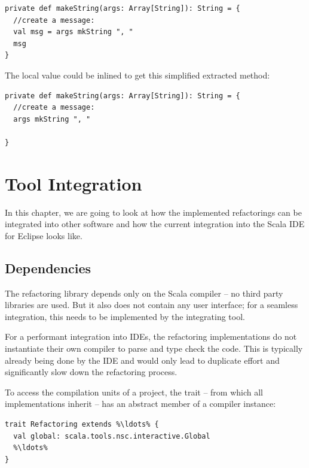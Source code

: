 \documentclass[10pt,a4paper,oneside]{scrreprt}
\begin{document}
\begin{lstlisting}
private def makeString(args: Array[String]): String = {
  //create a message:
  val msg = args mkString ", "
  msg
}
\end{lstlisting}

The local value  could be inlined to get this simplified extracted method:

\begin{lstlisting}
private def makeString(args: Array[String]): String = {
  //create a message:
  args mkString ", "

}
\end{lstlisting}

\label{end-chapter:implemented-refactorings}

\chapter{Tool Integration} \label{chapter:tool-integration}

In this chapter, we are going to look at how the implemented refactorings can be integrated into other software and how the current integration into the Scala IDE for Eclipse looks like.

\section{Dependencies}

The refactoring library depends only on the Scala compiler -- no third party libraries are used. But it also does not contain any user interface; for a seamless integration, this needs to be implemented by the integrating tool.

For a performant integration into IDEs, the refactoring implementations do not instantiate their own compiler to parse and type check the code. This is typically already being done by the IDE and would only lead to duplicate effort and significantly slow down the refactoring process.

To access the compilation units of a project, the  trait -- from which all implementations inherit -- has an abstract member of a compiler instance:

\begin{lstlisting}
trait Refactoring extends %\ldots% {
  val global: scala.tools.nsc.interactive.Global
  %\ldots% 
}
\end{lstlisting}
\end{document}
